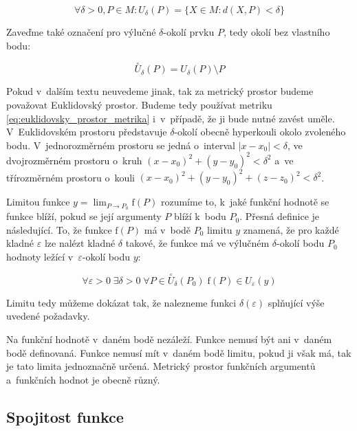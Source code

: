 \begin{equation}
\forall \delta > 0, P \in M: U_{\delta}(P) = \{X \in M: d(X, P) < \delta\}
\end{equation}

Zaveďme také označení pro výlučné \(\delta\)-okolí prvku \(P\), tedy okolí bez vlastního bodu:

\begin{equation}
\overset{\circ}{U}_{\delta}(P) = U_{\delta}(P) \setminus P
\end{equation}

Pokud v~dalším textu neuvedeme jinak, tak za metrický prostor budeme považovat Euklidovský prostor. Budeme tedy používat metriku \eqref{eq:euklidovsky_prostor_metrika} i~v~případě, že ji bude nutné zavést uměle. V~Euklidovském prostoru představuje  \(\delta\)-okolí obecně hyperkouli okolo zvoleného bodu. V~jednorozměrném prostoru se jedná o~interval \(|x - x_0| < \delta\), ve dvojrozměrném prostoru o~kruh \((x - x_0)^2 + (y - y_0)^2 < \delta^2\) a~ve třírozměrném prostoru o~kouli \((x - x_0)^2 + (y - y_0)^2 + (z - z_0)^2 < \delta^2\).

Limitou funkce \(y = \lim_{P \to P_0} \mathrm{f}(P)\) rozumíme to, k~jaké funkční hodnotě se funkce blíží, pokud se její argumenty \(P\) blíží k~bodu \(P_0\). Přesná definice je následující. To, že funkce \(\mathrm{f}(P)\) má v~bodě \(P_0\) limitu \(y\) znamená, že pro každé kladné \(\varepsilon\) lze nalézt kladné \(\delta\) takové, že funkce má ve výlučném \(\delta\)-okolí bodu \(P_0\) hodnoty ležící v~\(\varepsilon\)-okolí bodu \(y\):

\begin{equation}
\forall \varepsilon > 0 \; \exists \delta > 0 \; \forall P \in \overset{\circ}{U}_{\delta}(P_0) \; \mathrm{f}(P) \in U_{\varepsilon}(y)
\end{equation}

Limitu tedy můžeme dokázat tak, že nalezneme funkci \(\delta(\varepsilon)\) splňující výše uvedené požadavky.

Na funkční hodnotě v~daném bodě nezáleží. Funkce nemusí být ani v~daném bodě definovaná. Funkce nemusí mít v~daném bodě limitu, pokud ji však má, tak je tato limita jednoznačně určená. Metrický prostor funkčních argumentů a~funkčních hodnot je obecně různý.

\subsection{Spojitost funkce}
\label{sec:spojitost_funkce}


